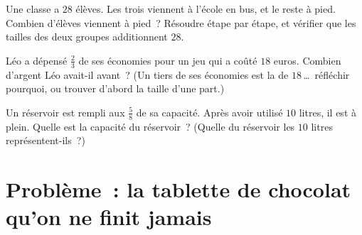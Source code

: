 \begin{exercise}[$\star\star$]\label{exo:g6:fractions:10}
Une classe a $28$ élèves. Les trois  viennent à l'école en bus,
et le reste à pied. Combien d'élèves viennent à pied~? Résoudre
étape par étape, et vérifier que les tailles des deux groupes
additionnent $28$.
\end{exercise}

\begin{exercise}[$\star\star$]\label{exo:g6:fractions:11}
Léo a dépensé $\frac23$ de ses économies pour un jeu qui a coûté
$18$ euros. Combien d'argent Léo avait-il avant~? (Un tiers de ses
économies est la  de $18$\,\dots\ réfléchir pourquoi, ou trouver
d'abord la taille d'une part.)
\end{exercise}

\begin{exercise}[$\star\star\star$]\label{exo:g6:fractions:12}
Un réservoir est rempli aux $\frac58$ de sa capacité. Après avoir
utilisé $10$ litres, il est à  plein. Quelle est la capacité du
réservoir~? (Quelle  du réservoir les $10$ litres
représentent-ils~?)
\end{exercise}

\section{Problème~: la tablette de chocolat qu'on ne finit jamais}

